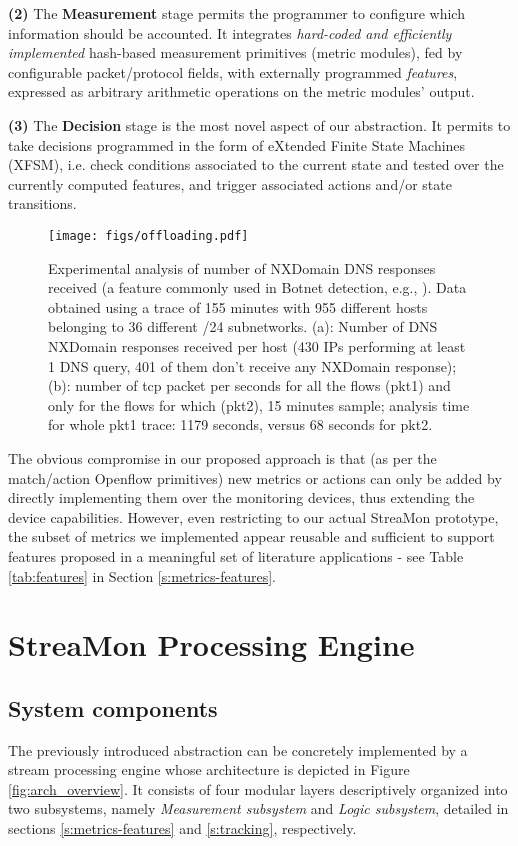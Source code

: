 \documentclass[conference,letterpaper]{sig-alternate-10pt}
\begin{document}
{\bf (2)} The {\bf Measurement} stage permits the programmer to configure which information should be accounted. It integrates {\em hard-coded and efficiently implemented} hash-based measurement primitives (metric modules), fed by configurable packet/protocol fields, with externally programmed {\em features}, expressed as arbitrary arithmetic operations on the metric modules' output. 

{\bf (3)} The {\bf Decision} stage is the most novel aspect of our abstraction. It permits to take decisions programmed in the form of eXtended Finite State Machines (XFSM), i.e. check conditions associated to the current state and tested over the currently computed features, and trigger associated actions and/or state transitions. 

\begin{figure}[!t]
\centering
   \texttt{[image: figs/offloading.pdf]}
\caption{Experimental analysis of number of NXDomain DNS responses received (a feature commonly used in Botnet detection, e.g., \cite{confickerc}). Data obtained using a trace of 155 minutes with 955 different hosts belonging to 36 different /24 subnetworks. (a): Number  of DNS NXDomain responses received per host (430 IPs performing at least 1 DNS query, 401 of them don't receive any NXDomain response); (b): number of tcp packet per seconds for all the flows (pkt1) and only for the flows for which  (pkt2), 15 minutes sample; analysis time for whole pkt1 trace: 1179 seconds, versus 68 seconds for pkt2.}
\vspace*{-.5cm}
\label{fig:offloading}
\end{figure}

The obvious compromise in our proposed approach is that (as per the match/action Openflow primitives) new metrics or actions can only be added by directly implementing them over the monitoring devices, thus extending the device capabilities. However, even restricting to our actual StreaMon prototype, the subset of metrics we implemented appear reusable and sufficient to support features proposed in a meaningful set of literature applications - see Table \ref{tab:features} in Section \ref{s:metrics-features}.



\section{StreaMon Processing Engine}
\label{s:at-a-glance}

\subsection{System components}
The previously introduced abstraction can be concretely implemented by a stream processing engine whose architecture is depicted in Figure \ref{fig:arch_overview}. It consists of four modular layers descriptively organized into two subsystems, namely {\em Measurement subsystem} and {\em Logic subsystem}, detailed in sections \ref{s:metrics-features} and \ref{s:tracking}, respectively.
\end{document}
